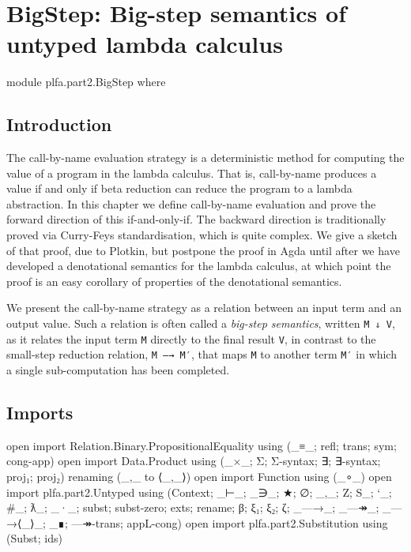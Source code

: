 \hypertarget{BigStep}{%
\chapter{BigStep: Big-step semantics of untyped lambda
calculus}\label{BigStep}}

\begin{fence}
\begin{code}
module plfa.part2.BigStep where
\end{code}
\end{fence}

\hypertarget{introduction}{%
\section{Introduction}\label{introduction}}

The call-by-name evaluation strategy is a deterministic method for
computing the value of a program in the lambda calculus. That is,
call-by-name produces a value if and only if beta reduction can reduce
the program to a lambda abstraction. In this chapter we define
call-by-name evaluation and prove the forward direction of this
if-and-only-if. The backward direction is traditionally proved via
Curry-Feys standardisation, which is quite complex. We give a sketch of
that proof, due to Plotkin, but postpone the proof in Agda until after
we have developed a denotational semantics for the lambda calculus, at
which point the proof is an easy corollary of properties of the
denotational semantics.

We present the call-by-name strategy as a relation between an input term
and an output value. Such a relation is often called a \emph{big-step
semantics}, written \texttt{M\ ⇓\ V}, as it relates the input term
\texttt{M} directly to the final result \texttt{V}, in contrast to the
small-step reduction relation, \texttt{M\ —→\ M′}, that maps \texttt{M}
to another term \texttt{M′} in which a single sub-computation has been
completed.

\hypertarget{imports}{%
\section{Imports}\label{imports}}

\begin{fence}
\begin{code}
open import Relation.Binary.PropositionalEquality
  using (_≡_; refl; trans; sym; cong-app)
open import Data.Product using (_×_; Σ; Σ-syntax; ∃; ∃-syntax; proj₁; proj₂)
  renaming (_,_ to ⟨_,_⟩)
open import Function using (_∘_)
open import plfa.part2.Untyped
  using (Context; _⊢_; _∋_; ★; ∅; _,_; Z; S_; `_; #_; ƛ_; _·_;
  subst; subst-zero; exts; rename; β; ξ₁; ξ₂; ζ; _—→_; _—↠_; _—→⟨_⟩_; _∎;
  —↠-trans; appL-cong)
open import plfa.part2.Substitution using (Subst; ids)
\end{code}
\end{fence}

